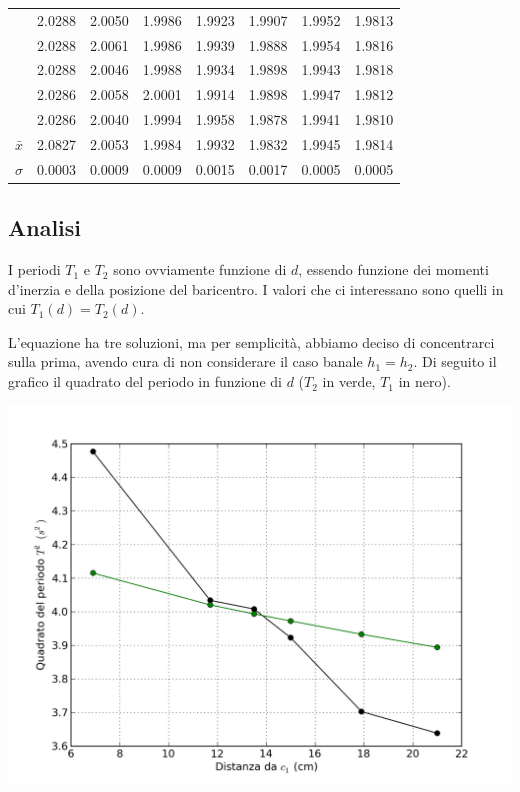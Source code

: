 \begin{center}
\begin{tabular}{*{8}{c}}
&2.0288&2.0050&1.9986 &1.9923 & 1.9907 & 1.9952 &	1.9813 \\
&2.0288&2.0061&1.9986 &1.9939 & 1.9888 & 1.9954 &	1.9816 \\
&2.0288&2.0046&1.9988 &1.9934 & 1.9898 & 1.9943 & 1.9818 \\
&2.0286&2.0058&2.0001 &1.9914 & 1.9898 & 1.9947 & 1.9812  \\
&2.0286&2.0040&1.9994 &1.9958 & 1.9878 & 1.9941 & 1.9810 \\
 \midrule
$\bar{x}$& 2.0827 & 2.0053 & 1.9984 & 1.9932 & 1.9832 & 1.9945 & 1.9814\\
$\sigma$ & 0.0003 & 0.0009 & 0.0009 & 0.0015 & 0.0017 & 0.0005 & 0.0005\\
\bottomrule
\end{tabular}
\end{center}

\subsection{Analisi}
I periodi $T_1$ e $T_2$ sono ovviamente funzione di $d$, essendo funzione dei momenti d'inerzia e della posizione del baricentro. I valori che ci interessano sono quelli in cui $T_1(d) = T_2(d)$.

L'equazione ha tre soluzioni, ma per semplicità, abbiamo deciso di concentrarci sulla prima, avendo cura di non considerare il caso banale $h_1=h_2$. Di seguito il grafico il quadrato del periodo in funzione di $d$ ($T_2$ in verde, $T_1$ in nero).

\begin{center}
\includegraphics[scale=0.60]{../grafici/kater/kater-punti-raw.png}
\end{center}

